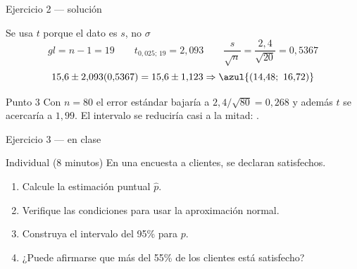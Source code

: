 \documentclass[aspectratio=169,10pt]{beamer}
\begin{document}
\begin{frame}{Ejercicio 2 — solución}
  \small
  \begin{block}{Se usa $t$ porque el dato es $s$, no $\sigma$}
    \[ gl=n-1=19 \qquad t_{0{,}025;\,19}=2{,}093
       \qquad \frac{s}{\sqrt{n}}=\frac{2{,}4}{\sqrt{20}}=0{,}5367 \]
    \[ 15{,}6 \pm 2{,}093(0{,}5367)=15{,}6\pm 1{,}123
       \Rightarrow \azul{(14{,}48;\ 16{,}72)} \]
  \end{block}

  \vspace{0.1cm}
  \begin{exampleblock}{Punto 3}
    \footnotesize
    Con $n=80$ el error estándar bajaría a $2{,}4/\sqrt{80}=0{,}268$ y además
    $t$ se acercaría a $1{,}99$. El intervalo se reduciría casi a la mitad:
    .
  \end{exampleblock}
\end{frame}

\begin{frame}{Ejercicio 3 — en clase}
  \begin{alertblock}{Individual (8 minutos)}
    En una encuesta a  clientes,  se declaran
    satisfechos.

    \vspace{0.25cm}
    \begin{enumerate}
      \item Calcule la estimación puntual $\hat{p}$.
      \item Verifique las condiciones para usar la aproximación normal.
      \item Construya el intervalo del 95\% para $p$.
      \item ¿Puede afirmarse que más del 55\% de los clientes está
            satisfecho?
    \end{enumerate}
  \end{alertblock}
\end{frame}
\end{document}
